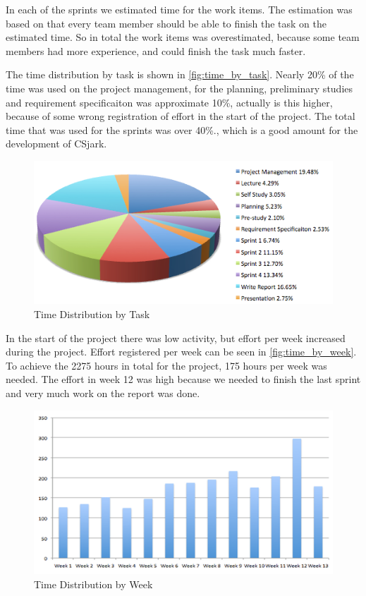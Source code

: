 In each of the sprints we estimated time for the work items. The estimation 
was based on that every team member should be able to finish the task on the 
estimated time. So in total the work items was overestimated, because some 
team members had more experience, and could finish the task much faster.

The time distribution by task is shown in \autoref{fig:time_by_task}. Nearly 
20\% of the time was used on the project management, for the planning, 
preliminary studies and requirement specificaiton was approximate 10\%, 
actually is this higher, because of some wrong registration of effort in the 
start of the project. The total time that was used for the sprints was over 
40\%., which is a good amount for the development of CSjark. 

\begin{figure}[htb]
	\center
	\includegraphics[width=\textwidth]{./evaluation/img/piechart_time}
	\caption{Time Distribution by Task\label{fig:time_by_task}}
\end{figure}

In the start of the project there was low activity, but effort per week 
increased during the project. Effort registered per week can be seen in 
\autoref{fig:time_by_week}. To achieve the 2275 hours in total for the 
project, 175 hours per week was needed. The effort in week 12 was high because 
we needed to finish the last sprint and very much work on the report was done.

\begin{figure}[htb]
	\center
	\includegraphics[width=\textwidth]{./evaluation/img/columnchart_effort} 
	\caption{Time Distribution by Week\label{fig:time_by_week}}
\end{figure}


